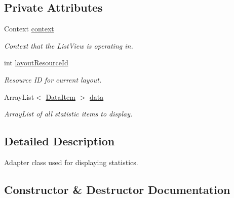 \subsection*{Private Attributes}
\begin{DoxyCompactItemize}
\item 
\mbox{\label{classcom_1_1jack_1_1motorbikestatistics_1_1_data_list_adapter_a2d3041a39701b01f4075cdc8c0bf4463}} 
Context \hyperlink{classcom_1_1jack_1_1motorbikestatistics_1_1_data_list_adapter_a2d3041a39701b01f4075cdc8c0bf4463}{context}
\begin{DoxyCompactList}\small\item\em Context that the List\+View is operating in. \end{DoxyCompactList}\item 
\mbox{\label{classcom_1_1jack_1_1motorbikestatistics_1_1_data_list_adapter_a03f68396c0f1b8b03feed8d6e3cf115d}} 
int \hyperlink{classcom_1_1jack_1_1motorbikestatistics_1_1_data_list_adapter_a03f68396c0f1b8b03feed8d6e3cf115d}{layout\+Resource\+Id}
\begin{DoxyCompactList}\small\item\em Resource ID for current layout. \end{DoxyCompactList}\item 
\mbox{\label{classcom_1_1jack_1_1motorbikestatistics_1_1_data_list_adapter_a1e45ca05e79075976732ea14de9fbc5d}} 
Array\+List$<$ \hyperlink{classcom_1_1jack_1_1motorbikestatistics_1_1_data_item}{Data\+Item} $>$ \hyperlink{classcom_1_1jack_1_1motorbikestatistics_1_1_data_list_adapter_a1e45ca05e79075976732ea14de9fbc5d}{data}
\begin{DoxyCompactList}\small\item\em Array\+List of all statistic items to display. \end{DoxyCompactList}\end{DoxyCompactItemize}


\subsection{Detailed Description}
Adapter class used for displaying statistics. 

\subsection{Constructor \& Destructor Documentation}
\mbox{\label{classcom_1_1jack_1_1motorbikestatistics_1_1_data_list_adapter_aa9aad25299a2df8a357569b6eb3c28b5}} 
